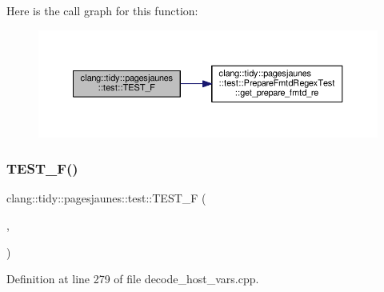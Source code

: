 Here is the call graph for this function\+:
\nopagebreak
\begin{figure}[H]
\begin{center}
\leavevmode
\includegraphics[width=350pt]{namespaceclang_1_1tidy_1_1pagesjaunes_1_1test_a3fb5315c6f6fff42c5c1b4023c647b1d_cgraph}
\end{center}
\end{figure}
\mbox{\label{namespaceclang_1_1tidy_1_1pagesjaunes_1_1test_ad227042216e1a35a4bc01881f7b764a5}} 
\subsubsection{\texorpdfstring{T\+E\+S\+T\+\_\+\+F()}{TEST\_F()}\hspace{0.1cm}{\footnotesize\ttfamily [51/57]}}
{\footnotesize\ttfamily clang\+::tidy\+::pagesjaunes\+::test\+::\+T\+E\+S\+T\+\_\+F (\begin{DoxyParamCaption}\item[{\hyperlink{classclang_1_1tidy_1_1pagesjaunes_1_1test_1_1_decode_host_vars_test}{Decode\+Host\+Vars\+Test}}]{,  }\item[{Decode\+Host\+Vars\+Struct}]{ }\end{DoxyParamCaption})}



Definition at line 279 of file decode\+\_\+host\+\_\+vars.\+cpp.

